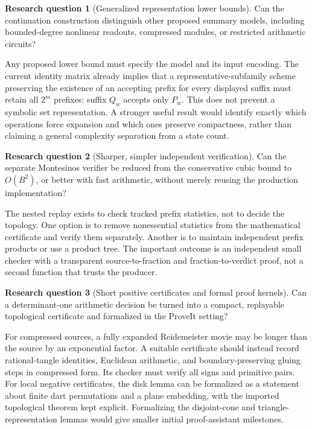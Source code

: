 \documentclass[11pt,a4paper]{article}
\theoremstyle{definition}
\newtheorem{researchquestion}{Research question}
\theoremstyle{remark}
\numberwithin{equation}{section}
\begin{document}
\begin{researchquestion}[Generalized representation lower bounds]
Can the continuation construction distinguish other proposed summary
models, including bounded-degree nonlinear readouts, compressed modules,
or restricted arithmetic circuits?
\end{researchquestion}
Any proposed lower bound must specify the model and its input encoding.
The current identity matrix already implies that a representative-subfamily
scheme preserving the existence of an accepting prefix for every displayed
suffix must retain all \(2^m\) prefixes: suffix \(Q_w\) accepts only \(P_w\).
This does not prevent a symbolic set representation. A stronger useful
result would identify exactly which operations force expansion and which
ones preserve compactness, rather than claiming a general complexity
separation from a state count.

\begin{researchquestion}[Sharper, simpler independent verification]
Can the separate Montesinos verifier be reduced from the conservative
cubic bound to \(O(B^2)\), or better with fast arithmetic, without merely
reusing the production implementation?
\end{researchquestion}
The nested replay exists to check tracked prefix statistics, not to decide
the topology. One option is to remove nonessential statistics from the
mathematical certificate and verify them separately. Another is to maintain
independent prefix products or use a product tree. The important outcome is
an independent small checker with a transparent source-to-fraction and
fraction-to-verdict proof, not a second function that trusts the producer.

\begin{researchquestion}[Short positive certificates and formal proof kernels]
Can a determinant-one arithmetic decision be turned into a compact,
replayable topological certificate and formalized in the ProveIt setting?
\end{researchquestion}
For compressed sources, a fully expanded Reidemeister movie may be longer
than the source by an exponential factor. A suitable certificate should
instead record rational-tangle identities, Euclidean arithmetic, and
boundary-preserving gluing steps in compressed form. Its checker must
verify all signs and primitive pairs. For local negative certificates,
the disk lemma can be formalized as a statement about finite dart
permutations and a plane embedding, with the imported topological theorem
kept explicit. Formalizing the disjoint-cone and triangle-representation
lemmas would give smaller initial proof-assistant milestones.
\end{document}
